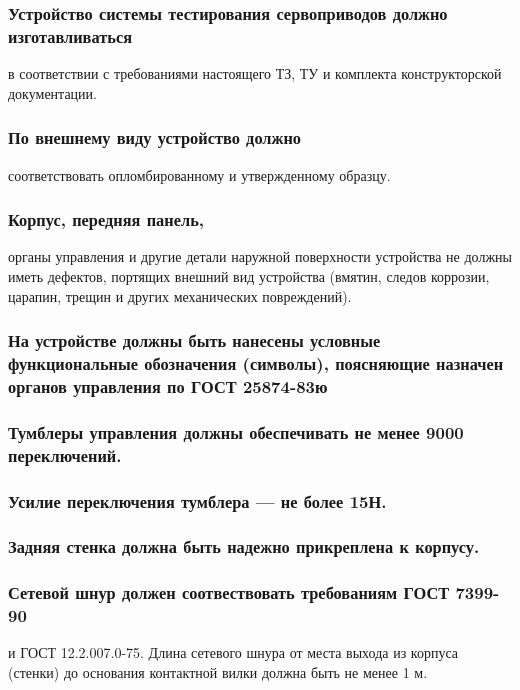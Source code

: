 \documentclass[a4paper]{bsuir-tor}
\begin{document}
  \subsubsection{Устройство системы тестирования сервоприводов должно
    изготавливаться}
  в соответствии с требованиями настоящего ТЗ, ТУ и комплекта конструкторской
  документации.

  \subsubsection{По внешнему виду устройство должно}
  соответствовать опломбированному и утвержденному образцу.
  
  \subsubsection{Корпус, передняя панель, }
  органы управления и другие детали наружной поверхности устройства не
  должны иметь дефектов, портящих внешний вид устройства (вмятин, следов
  коррозии, царапин, трещин и других механических повреждений).
  
  \subsubsection{На устройстве должны быть нанесены условные функциональные 
  обозначения (символы), поясняющие назначен органов управления
  по ГОСТ 25874-83ю}
  
  \subsubsection{Тумблеры управления
  должны обеспечивать не менее 9000 переключений.}
  
  \subsubsection{Усилие переключения тумблера — не более 15Н.}
  
  \subsubsection{Задняя стенка должна быть надежно прикреплена к корпусу.}

  \subsubsection{Сетевой шнур должен соотвествовать требованиям ГОСТ 7399-90}
  и ГОСТ 12.2.007.0-75. Длина сетевого шнура от места выхода из корпуса
  (стенки) до основания контактной вилки должна быть не менее 1 м.
  
\end{document}
